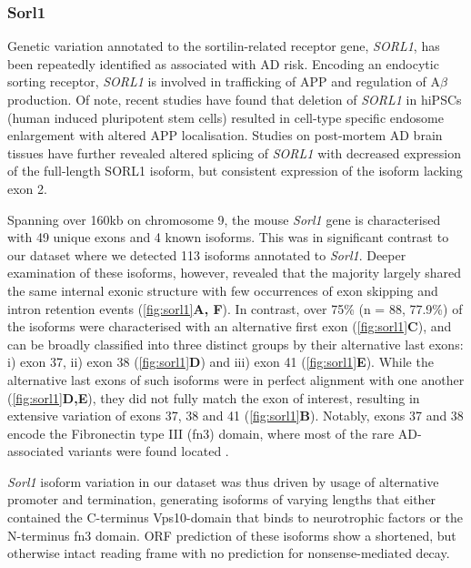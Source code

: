 \newpage
\subsubsection{Sorl1}
Genetic variation annotated to the sortilin-related receptor gene, \textit{SORL1}, has been repeatedly identified as associated with AD risk\cite{Fernandez2016}. Encoding an endocytic sorting receptor, \textit{SORL1} is involved in trafficking of APP and regulation of A$\beta$ production\cite{Knupp2020}. Of note, recent studies have found that deletion of \textit{SORL1} in hiPSCs (human induced pluripotent stem cells) resulted in cell-type specific endosome enlargement with altered APP localisation\cite{Knupp2020}. Studies on post-mortem AD brain tissues have further revealed altered splicing of \textit{SORL1} with decreased expression of the full-length SORL1 isoform, but consistent expression of the isoform lacking exon 2\cite{Grear2009}.  

Spanning over 160kb on chromosome 9, the mouse \textit{Sorl1} gene is characterised with 49 unique exons and 4 known isoforms. This was in significant contrast to our dataset where we detected 113 isoforms annotated to \textit{Sorl1}. Deeper examination of these isoforms, however, revealed that the majority largely shared the same internal exonic structure with few occurrences of exon skipping and intron retention events (\cref{fig:sorl1}\textbf{A, F}). In contrast, over 75\% (n = 88, 77.9\%) of the isoforms were characterised with an alternative first exon (\cref{fig:sorl1}\textbf{C}), and can be broadly classified into three distinct groups by their alternative last exons: i) exon 37, ii) exon 38 (\cref{fig:sorl1}\textbf{D}) and iii) exon 41 (\cref{fig:sorl1}\textbf{E}). While the alternative last exons of such isoforms were in perfect alignment with one another (\cref{fig:sorl1}\textbf{D,E}), they did not fully match the exon of interest, resulting in extensive variation of exons 37, 38 and 41 (\cref{fig:sorl1}\textbf{B}). Notably, exons 37 and 38 encode the Fibronectin type III (fn3) domain, where most of the rare AD-associated variants were found located \cite{Verheijen2016}. 

\textit{Sorl1} isoform variation in our dataset was thus driven by usage of alternative promoter and termination, generating isoforms of varying lengths that either contained the C-terminus Vps10-domain that binds to neurotrophic factors or the N-terminus fn3 domain. ORF prediction of these isoforms show a shortened, but otherwise intact reading frame with no prediction for nonsense-mediated decay. 

